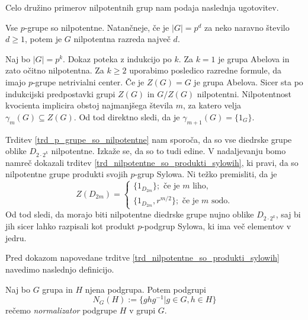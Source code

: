 Celo družino primerov nilpotentnih grup nam podaja naslednja ugotovitev.
\begin{trditev}
\label{trd_p_grupe_so_nilpotentne}
    Vse $p$-grupe so nilpotentne. Natančneje, če je $\lvert G \rvert  = p^{d}$ za neko naravno število $d \ge 1$, potem je $G$ nilpotentna razreda največ $d$. 
\end{trditev}
\begin{dokaz}
    Naj bo $\lvert G \rvert = p^k$. Dokaz poteka z indukcijo po $k$. Za $k = 1$ je grupa Abelova in zato očitno nilpotentna. Za $k \ge 2$ uporabimo posledico razredne formule, da imajo $p$-grupe netrivialni center.
    Če je $Z(G) = G$ je grupa Abelova. Sicer sta po indukcijski predpostavki grupi $Z(G)$ in $G / Z(G)$ nilpotentni. Nilpotentnost kvocienta implicira obstoj najmanjšega števila $m$, za katero velja $\gamma_m(G) \subseteq Z(G)$.
    Od tod direktno sledi, da je $\gamma_{m + 1}(G) = \{ 1_G \}$.
\end{dokaz}

\begin{primer}
    Trditev \ref{trd_p_grupe_so_nilpotentne} nam sporoča, da so vse diedrske grupe oblike $D_{2 \cdot 2^{k}}$ nilpotentne. Izkaže se, da so to tudi edine. V nadaljevanju bomo namreč dokazali trditev \ref{trd_nilpotentne_so_produkti_sylowih}, ki pravi, da so nilpotentne grupe
    produkti svojih $p$-grup Sylowa. Ni težko premisliti, da je \begin{equation*}
        Z(D_{2m}) = \begin{cases}
            \{ 1_{D_{2m}} \}  ; \text{ če je $m$ liho}, \\
            \{ 1_{D_{2m}}, r^{m / 2} \} ;  \text{ če je $m$ sodo}.
        \end{cases}
    \end{equation*}
    Od tod sledi, da morajo biti nilpotentne diedrske grupe nujno oblike $D_{2 \cdot 2^{k}}$, saj bi jih sicer lahko razpisali kot produkt $p$-podgrup Sylowa, ki ima več elementov v jedru.
    \end{primer}

Pred dokazom napovedane trditve \ref{trd_nilpotentne_so_produkti_sylowih} navedimo naslednjo definicijo.

\begin{definicija}\label{def_normalizator}
    Naj bo $G$ grupa in $H$ njena podgrupa. Potem podgrupi \begin{equation*}
        N_G(H) := \{ g h g^{-1}  \vert  g \in G, h \in H \}
    \end{equation*}
    rečemo \emph{normalizator} podgrupe $H$ v grupi $G$. %
\end{definicija}

